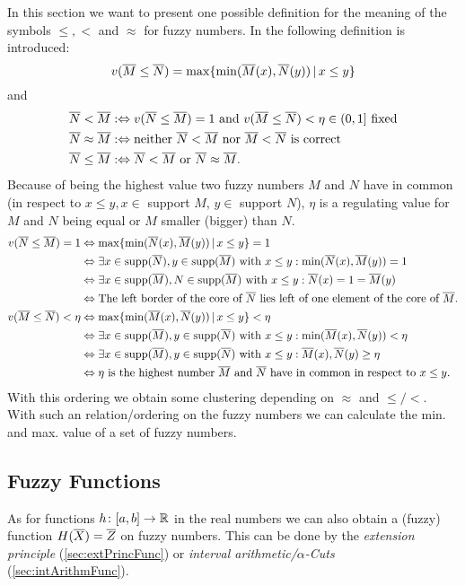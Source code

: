 In this section we want to present one possible definition for the meaning of the symbols $\leq,<$ and $\approx$ for fuzzy numbers. In \cite{SimulatingFuzzySystems} the following definition is introduced:
\[ v(\overline{M}\leq\overline{N})=\max\{ \min(\overline{M}(x), \overline{N}(y))\, |\, x\leq y \} \]
and
\begin{align*}
\overline{N} < \overline{M} &:\Leftrightarrow v(\overline{N} \leq \overline{M})=1 \text{ and } v(\overline{M} \leq \overline{N})<\eta \in (0,1] \text{ fixed} \\
\overline{N} \approx \overline{M} &:\Leftrightarrow \text{neither } \overline{N}<\overline{M} \text{ nor } \overline{M}<\overline{N} \text{ is correct} \\
\overline{N} \leq \overline{M} &:\Leftrightarrow \overline{N} < \overline{M} \text{ or } \overline{N}\approx\overline{M}.
\end{align*}
Because of being the highest value  two fuzzy numbers $M$ and $N$ have in common (in respect to $x\leq y, x\in$ support $M$, $y\in$ support $N$), $\eta$ is a regulating value for $M$ and $N$ being equal or $M$ smaller (bigger) than $N$.
\begin{align*}
v(\overline{N} \leq \overline{M}) = 1 &\Leftrightarrow \max\{ \min(\overline{N}(x), \overline{M}(y))\, |\, x\leq y \} = 1 \\
&\Leftrightarrow \exists x\in\operatorname{supp}(\overline{N}),y\in\operatorname{supp}(\overline{M}) \text{ with } x\leq y: \min(\overline{N}(x), \overline{M}(y)) = 1 \\
&\Leftrightarrow \exists x\in\operatorname{supp}(\overline{M}),N\in\operatorname{supp}(\overline{M}) \text{ with } x\leq y: \overline{N}(x) = 1 = \overline{M}(y) \\
&\Leftrightarrow \text{The left border of the core of $\overline{N}$ lies left of one element of the core of $\overline{M}$}. \\
v(\overline{M} \leq \overline{N}) < \eta &\Leftrightarrow \max\{ \min(\overline{M}(x), \overline{N}(y))\, |\, x\leq y \} < \eta \\
&\Leftrightarrow \exists x\in\operatorname{supp}(\overline{M}),y\in\operatorname{supp}(\overline{N}) \text{ with } x\leq y: \min(\overline{M}(x), \overline{N}(y)) < \eta \\
&\Leftrightarrow \exists x\in\operatorname{supp}(\overline{M}),y\in\operatorname{supp}(\overline{N}) \text{ with } x\leq y: \overline{M}(x), \overline{N}(y) \geq \eta \\
&\Leftrightarrow \text{$\eta$ is the highest number $\overline{M}$ and $\overline{N}$ have in common in respect to $x\leq y$}.
\end{align*}
With this ordering we obtain some clustering depending on $\approx$ and $\leq/<$.\\
With such an relation/ordering on the fuzzy numbers we can calculate the min. and max. value of a set of fuzzy numbers.


\subsection{Fuzzy Functions}
As for functions $h\colon [a,b]\rightarrow\mathbb{R}$ in the real numbers we can also obtain a (fuzzy) function $H(\overline{X})=\overline{Z}$ on fuzzy numbers. This can be done by the \emph{extension principle} (\ref{sec:extPrincFunc}) or \emph{interval arithmetic/$\alpha$-Cuts} (\ref{sec:intArithmFunc}).

